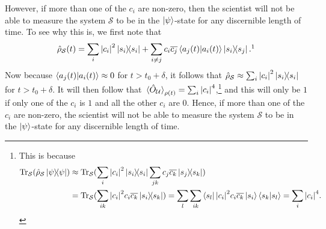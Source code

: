     However, if more than one of the $c_i$ are non-zero, then the scientist will not be able to measure the system $\mathcal{S}$ to be in the $\ket{\psi}$-state for any discernible length of time. To see why this is, we first note that 
    \begin{equation}\label{reduced}\hat{\rho}_\mathcal{S}(t)=\sum_{i}\abs{c_i}^2\dyad{s_i}+\sum_{i\neq j}c_i\overline{c_j}\ip{a_j(t)}{a_i(t)} \dyad{s_i}{s_j}.\protect\footnotemark
    \end{equation}
    Now because $\ip{a_j(t)}{a_i(t)}\approx 0$ for $t>t_0+\delta$, it follows that $\hat{\rho}_\mathcal{S}\approx \sum_i\abs{c_i}^2\dyad{s_i}$ for $t>t_0+\delta$. It will then follow that $\ev*{\hat{O}_\mathcal{U}}_{\rho(t)}=\sum_i\abs{c_i}^4$,\footnote{This is because
    \begin{align*}\Tr_\mathcal{S}(\hat{\rho}_\mathcal{S}\dyad{\psi})&\approx \Tr_\mathcal{S}(\sum_i\abs{c_i}^2\dyad{s_i}\sum_{jk} c_j \overline{c_k}\dyad{s_j}{s_k})\\
    &=\Tr_\mathcal{S}(\sum_{ik}\abs{c_i}^2 c_i\overline{c_k}\dyad{s_i}{s_k})=\sum_l\sum_{ik}\bra{s_l}\abs{c_i}^2 c_i\overline{c_k}\ket{s_i}\ip{s_k}{s_l}=\sum_i\abs{c_i}^4.\end{align*}} and this will only be $1$ if only one of the $c_i$ is $1$ and all the other $c_i$ are 0. Hence, if more than one of the $c_i$ are non-zero, the scientist will not be able to measure the system $\mathcal{S}$ to be in the $\ket{\psi}$-state for any discernible length of time.
